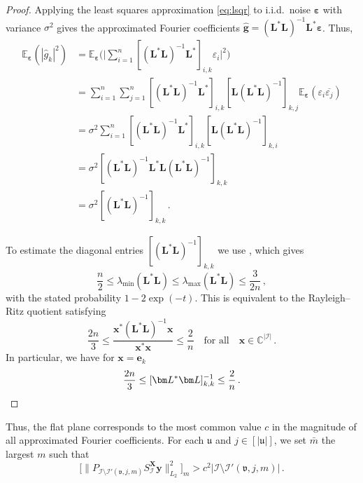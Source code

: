 \documentclass[a4paper]{scrartcl}
\numberwithin{equation}{section}
\begin{document}
\begin{proof} Applying the least squares approximation \eqref{eq:lsqr} to i.i.d.\ noise $\bm\varepsilon$ with variance $\sigma ^2$ gives the approximated Fourier coefficients $ \bm{\hat g} = (\bm L^\ast\bm L)^{-1}\bm L^\ast\bm\varepsilon $.
    Thus,
    \begin{align*}
        \mathds E_{\bm\varepsilon}(|\hat g_k|^2)
        &= \mathds E_{\bm\varepsilon}\Big(\Big| \sum_{i=1}^{n} [(\bm L^\ast\bm L)^{-1}\bm L^\ast]_{i,k} \varepsilon_i \Big|^2\Big) \\
        &= \sum_{i=1}^{n} \sum_{j=1}^{n} [(\bm L^\ast\bm L)^{-1}\bm L^\ast]_{i,k} [\bm L(\bm L^\ast\bm L)^{-1}]_{k,j} \mathds E_{\bm\varepsilon}( \varepsilon_i \overline{\varepsilon_j}) \\
        &= \sigma^2 \sum_{i=1}^{n} [(\bm L^\ast\bm L)^{-1}\bm L^\ast]_{i,k} [\bm L(\bm L^\ast\bm L)^{-1}]_{k,i} \\
        &= \sigma^2 [(\bm L^\ast\bm L)^{-1}\bm L^\ast\bm L(\bm L^\ast\bm L)^{-1}]_{k,k} \\
        &= \sigma^2 [(\bm L^\ast\bm L)^{-1}]_{k,k} \,.
    \end{align*}

    To estimate the diagonal entries $[(\bm L^\ast\bm L)^{-1}]_{k,k}$ we use \cite[Lemmata~6.2 and 6.4]{Barteldiss}, which gives
    \begin{equation*}
        \frac{n}{2}
        \le
        \lambda_{\min}( \bm L^\ast\bm L )
        \le \lambda_{\max}( \bm L^\ast\bm L )
        \le \frac{3}{2n} \,,
    \end{equation*}
    with the stated probability $1-2\exp(-t)$.
    This is equivalent to the Rayleigh--Ritz quotient satisfying
    \begin{equation*}
        \frac{2n}{3}
        \le
        \frac{ \bm x^\ast (\bm L^\ast\bm L)^{-1} \bm x}{\bm x^\ast\bm x}
        \le
        \frac{2}{n}
        \quad\text{for all}\quad
        \bm x\in\mathds C^{|\mathcal I|} \,.
    \end{equation*}
    In particular, we have for $\bm x = \bm e_k$
    \begin{equation*}
        \frac{2n}{3}
        \le
        [\bm L^\ast\bm L]_{k,k}^{-1}
        \le
        \frac{2}{n} \,. \qedhere
    \end{equation*}
\end{proof} 

Thus, the flat plane corresponds to the most common value $c$ in the magnitude of all approximated Fourier coefficients.
For each $\mathfrak u$ and $j\in[|\mathfrak u|]$, we set $\bar m$ the largest $m$ such that
\begin{equation*}
    \Big[\|P_{\mathcal I\setminus\mathcal I'(\mathfrak v,j\mathfrak ,m)} S_{\mathcal I}^{\bm X}\bm y\|_{L_2}^2 \Big]_m
    > c^2 |\mathcal I\setminus\mathcal I'(\mathfrak v,j\mathfrak ,m)| \,.
\end{equation*}
\end{document}
